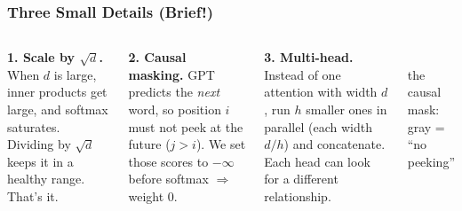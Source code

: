 \begin{frame}
    \frametitle{Three Small Details (Brief!)}

    \begin{columns}[T,onlytextwidth]
            \textbf{1. Scale by $\sqrt{d}$.} When $d$ is large, inner products get large, and softmax \alert{saturates}. Dividing by $\sqrt{d}$ keeps it in a healthy range. That's it.

            \vspace{2mm}
            \pause

            \textbf{2. Causal masking.} GPT predicts the \emph{next} word, so position $i$ must not peek at the \alert{future} ($j > i$). We set those scores to $-\infty$ before softmax $\Rightarrow$ weight $0$.

            \vspace{2mm}
            \pause

            \textbf{3. Multi-head.} Instead of one attention with width $d$, run $h$ \alert{smaller ones in parallel} (each width $d/h$) and concatenate. Each head can look for a different relationship.
            \begin{center}
            \\[1mm]
            {\scriptsize the causal mask: \\ gray = ``no peeking''}
            \end{center}
    \end{columns}
\end{frame}

